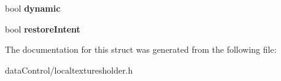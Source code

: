 \begin{DoxyCompactItemize}
\item 
\hypertarget{struct_tempest_1_1_local_textures_holder_1_1_non_freed_data_a3ab2f99a853b750cf3bb406d0e37fac3}{bool {\bfseries dynamic}}\label{struct_tempest_1_1_local_textures_holder_1_1_non_freed_data_a3ab2f99a853b750cf3bb406d0e37fac3}

\item 
\hypertarget{struct_tempest_1_1_local_textures_holder_1_1_non_freed_data_a21da4bc9fb54f4853196b4acc476ba47}{bool {\bfseries restore\+Intent}}\label{struct_tempest_1_1_local_textures_holder_1_1_non_freed_data_a21da4bc9fb54f4853196b4acc476ba47}

\end{DoxyCompactItemize}


The documentation for this struct was generated from the following file\+:\begin{DoxyCompactItemize}
\item 
data\+Control/localtexturesholder.\+h\end{DoxyCompactItemize}

